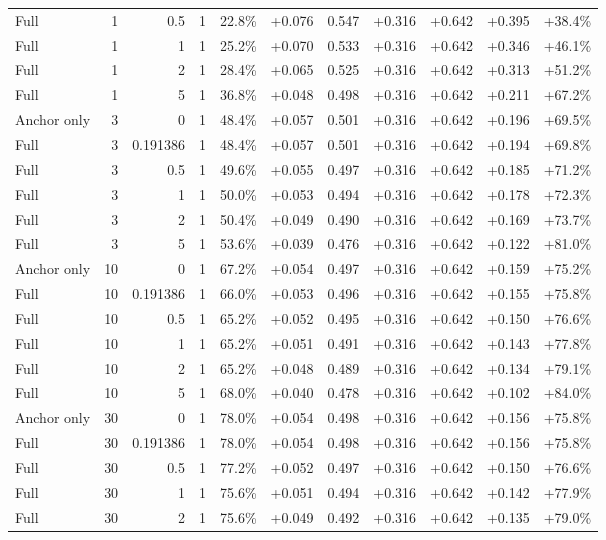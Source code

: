 \begin{table}[htbp]
\begin{tabular}{lrrrccccccc}
Full & 1 & 0.5 & 1 & 22.8\% & +0.076 & 0.547 & +0.316 & +0.642 & +0.395 & +38.4\% \\
Full & 1 & 1 & 1 & 25.2\% & +0.070 & 0.533 & +0.316 & +0.642 & +0.346 & +46.1\% \\
Full & 1 & 2 & 1 & 28.4\% & +0.065 & 0.525 & +0.316 & +0.642 & +0.313 & +51.2\% \\
Full & 1 & 5 & 1 & 36.8\% & +0.048 & 0.498 & +0.316 & +0.642 & +0.211 & +67.2\% \\
Anchor only & 3 & 0 & 1 & 48.4\% & +0.057 & 0.501 & +0.316 & +0.642 & +0.196 & +69.5\% \\
Full & 3 & 0.191386 & 1 & 48.4\% & +0.057 & 0.501 & +0.316 & +0.642 & +0.194 & +69.8\% \\
Full & 3 & 0.5 & 1 & 49.6\% & +0.055 & 0.497 & +0.316 & +0.642 & +0.185 & +71.2\% \\
Full & 3 & 1 & 1 & 50.0\% & +0.053 & 0.494 & +0.316 & +0.642 & +0.178 & +72.3\% \\
Full & 3 & 2 & 1 & 50.4\% & +0.049 & 0.490 & +0.316 & +0.642 & +0.169 & +73.7\% \\
Full & 3 & 5 & 1 & 53.6\% & +0.039 & 0.476 & +0.316 & +0.642 & +0.122 & +81.0\% \\
Anchor only & 10 & 0 & 1 & 67.2\% & +0.054 & 0.497 & +0.316 & +0.642 & +0.159 & +75.2\% \\
Full & 10 & 0.191386 & 1 & 66.0\% & +0.053 & 0.496 & +0.316 & +0.642 & +0.155 & +75.8\% \\
Full & 10 & 0.5 & 1 & 65.2\% & +0.052 & 0.495 & +0.316 & +0.642 & +0.150 & +76.6\% \\
Full & 10 & 1 & 1 & 65.2\% & +0.051 & 0.491 & +0.316 & +0.642 & +0.143 & +77.8\% \\
Full & 10 & 2 & 1 & 65.2\% & +0.048 & 0.489 & +0.316 & +0.642 & +0.134 & +79.1\% \\
Full & 10 & 5 & 1 & 68.0\% & +0.040 & 0.478 & +0.316 & +0.642 & +0.102 & +84.0\% \\
Anchor only & 30 & 0 & 1 & 78.0\% & +0.054 & 0.498 & +0.316 & +0.642 & +0.156 & +75.8\% \\
Full & 30 & 0.191386 & 1 & 78.0\% & +0.054 & 0.498 & +0.316 & +0.642 & +0.156 & +75.8\% \\
Full & 30 & 0.5 & 1 & 77.2\% & +0.052 & 0.497 & +0.316 & +0.642 & +0.150 & +76.6\% \\
Full & 30 & 1 & 1 & 75.6\% & +0.051 & 0.494 & +0.316 & +0.642 & +0.142 & +77.9\% \\
Full & 30 & 2 & 1 & 75.6\% & +0.049 & 0.492 & +0.316 & +0.642 & +0.135 & +79.0\% \\

\end{tabular}
\end{table}
